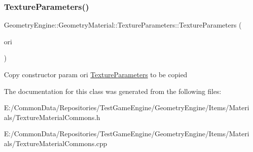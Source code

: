 \subsubsection{\texorpdfstring{TextureParameters()}{TextureParameters()}\hspace{0.1cm}{\footnotesize\ttfamily [2/2]}}
{\footnotesize\ttfamily Geometry\+Engine\+::\+Geometry\+Material\+::\+Texture\+Parameters\+::\+Texture\+Parameters (\begin{DoxyParamCaption}\item[{const \mbox{\hyperlink{class_geometry_engine_1_1_geometry_material_1_1_texture_parameters}{Texture\+Parameters}} \&}]{ori }\end{DoxyParamCaption})\hspace{0.3cm}{\ttfamily [inline]}}

Copy constructor param ori \mbox{\hyperlink{class_geometry_engine_1_1_geometry_material_1_1_texture_parameters}{Texture\+Parameters}} to be copied 

The documentation for this class was generated from the following files\+:\begin{DoxyCompactItemize}
\item 
E\+:/\+Common\+Data/\+Repositories/\+Test\+Game\+Engine/\+Geometry\+Engine/\+Items/\+Materials/Texture\+Material\+Commons.\+h\item 
E\+:/\+Common\+Data/\+Repositories/\+Test\+Game\+Engine/\+Geometry\+Engine/\+Items/\+Materials/Texture\+Material\+Commons.\+cpp\end{DoxyCompactItemize}
